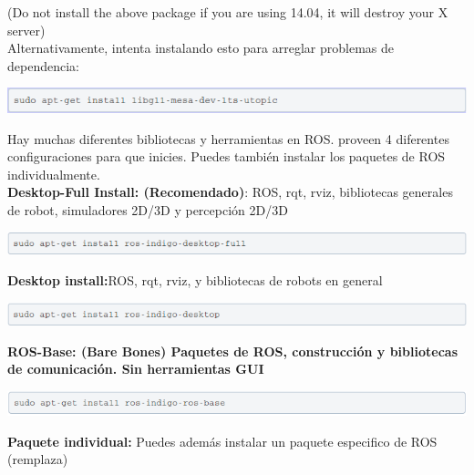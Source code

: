 \documentclass[user_manual.tex]{subfiles}
\begin{document}
(Do not install the above package if you are using 14.04, it will destroy your X server)\\
Alternativamente, intenta instalando esto para arreglar problemas de\\ dependencia: 

\begin{center}
\includegraphics[width=1\textwidth]{Figures/Software/Install_ROS/Paso_6.png}
\end{center}

Hay muchas diferentes bibliotecas y herramientas en ROS. proveen 4 diferentes configuraciones para que inicies. Puedes 
también instalar los paquetes de ROS individualmente.\\

\textbf{Desktop-Full Install: (Recomendado)}: ROS, rqt, rviz, bibliotecas generales de robot, simuladores 2D/3D y 
percepción 2D/3D\\


\begin{center}
\includegraphics[width=1\textwidth]{Figures/Software/Install_ROS/Paso_7.png}
\end{center}

\textbf{Desktop install:}ROS, rqt, rviz, y bibliotecas de robots en general

\begin{center}
\includegraphics[width=1\textwidth]{Figures/Software/Install_ROS/Paso_8.png}
\end{center}

\textbf{ROS-Base: (Bare Bones) Paquetes de ROS, construcción y bibliotecas de comunicación. Sin herramientas GUI}

\begin{center}
\includegraphics[width=1\textwidth]{Figures/Software/Install_ROS/Paso_9.png}
\end{center}

\textbf{Paquete individual:} Puedes además instalar un paquete especifico de ROS (remplaza)
\end{document}
